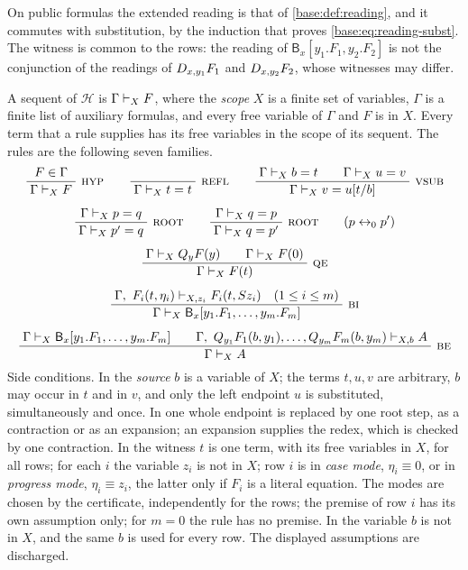 On public formulas the extended reading is that of
\cref{base:def:reading}, and it commutes with substitution, by the
induction that proves \eqref{base:eq:reading-subst}. The witness is common
to the rows: the reading of $\mathsf B_x[y_1.F_1,y_2.F_2]$ is not the
conjunction of the readings of $D_{x,y_1}F_1$ and $D_{x,y_2}F_2$, whose
witnesses may differ.

\begin{definition}
\label{disch:def:bundle-calc}
A sequent of $\mathcal H$ is $\Gamma\vdash_XF$, where the \emph{scope} $X$
is a finite set of variables, $\Gamma$ is a finite list of auxiliary
formulas, and every free variable of $\Gamma$ and $F$ is in $X$. Every term
that a rule supplies has its free variables in the scope of its sequent.
The rules are the following seven families.
\begin{gather*}
 \infrule{F\in\Gamma}{\Gamma\proves_XF}\ \rulename{Hyp}
 \qquad
 \infrule{}{\Gamma\proves_Xt=t}\ \rulename{Refl}
 \qquad
 \infrule{\Gamma\proves_Xb=t\qquad\Gamma\proves_Xu=v}
         {\Gamma\proves_Xv=u\subst{t}{b}}\ \rulename{VSub}
 \\[1.2ex]
 \infrule{\Gamma\proves_Xp=q}{\Gamma\proves_Xp'=q}\ \rulename{Root}
 \qquad
 \infrule{\Gamma\proves_Xq=p}{\Gamma\proves_Xq=p'}\ \rulename{Root}
 \qquad(p\leftrightarrow_0p')
 \\[1.2ex]
 \infrule{\Gamma\proves_X\Q{y}F(y)\qquad\Gamma\proves_XF(0)}
         {\Gamma\proves_XF(t)}\ \rulename{QE}
 \\[1.2ex]
 \infrule{\Gamma,\ F_i(t,\eta_i)\proves_{X,z_i}F_i(t,\Suc z_i)
          \quad(1\leq i\leq m)}
         {\Gamma\proves_X\mathsf B_x[y_1.F_1,\dots,y_m.F_m]}\ \rulename{BI}
 \\[1.2ex]
 \infrule{\Gamma\proves_X\mathsf B_x[y_1.F_1,\dots,y_m.F_m]\qquad
          \Gamma,\ \Q{y_1}F_1(b,y_1),\dots,\Q{y_m}F_m(b,y_m)\proves_{X,b}A}
         {\Gamma\proves_XA}\ \rulename{BE}
\end{gather*}
Side conditions. In  the \emph{source} $b$ is a variable of
$X$; the terms $t,u,v$ are arbitrary, $b$ may occur in $t$ and in $v$, and
only the left endpoint $u$ is substituted, simultaneously and once. In
 one whole endpoint is replaced by one root step, as a
contraction or as an expansion; an expansion supplies the redex, which is
checked by one contraction. In  the witness $t$ is one term,
with its free variables in $X$, for all rows; for each $i$ the variable
$z_i$ is not in $X$; row $i$ is in \emph{case mode}, $\eta_i\equiv0$, or in
\emph{progress mode}, $\eta_i\equiv z_i$, the latter only if $F_i$ is a
literal equation. The modes are chosen by the certificate, independently
for the rows; the premise of row $i$ has its own assumption only; for
$m=0$ the rule has no premise. In  the variable $b$ is not in
$X$, and the same $b$ is used for every row. The displayed assumptions are
discharged.
\end{definition}

